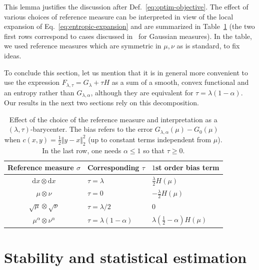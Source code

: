 \documentclass[11pt]{article}
\renewcommand{\d}{\mathrm{d}}
\begin{document}
This lemma justifies the discussion after Def.~\ref{eq:optim-objective}. The effect of various choices of reference measure can be interpreted in view of the local expansion of Eq.~\eqref{eq:entropic-expansion} and are summarized in Table~\ref{table:reference-measures} (the two first rows correspond to cases discussed in~\cite{janati2020debiased} for Gaussian measures). In the table, we used reference measures which are symmetric in $\mu,\nu$ as is standard, to fix ideas.

To conclude this section, let us mention that it is in general more convenient to use the expression $F_{\lambda,\tau}=G_\lambda +\tau H$ as a sum of a smooth, convex functional and an entropy rather than $G_{\lambda,\alpha}$, although they are equivalent for $\tau=\lambda(1-\alpha)$. Our results in the next two sections rely on this decomposition.

\begin{table}
\centering
\begin{tabular}{c|l|l}
Reference measure $\sigma$ & Corresponding $\tau$ & $1$st order bias term \\
\hline
$\d x \otimes \d x$ &$ \tau=\lambda$ & $\frac{\lambda}{2}H(\mu)$ \\
$ \mu \otimes \nu$ & $\tau=0 $ & $- \frac{\lambda}{2} H(\mu) $  \\
$ \sqrt{\mu} \otimes \sqrt{\nu}$ &$\tau=\lambda/2$& $0$  \\
$\mu^\alpha\otimes \nu^\alpha$  &$ \tau=\lambda(1-\alpha)$& $\lambda(\frac12-\alpha)H(\mu)$  \\
\hline
\end{tabular}
\caption{Effect of the choice of the reference measure and interpretation as a $(\lambda,\tau)$-barycenter. The bias refers to the error $G_{\lambda,\alpha}(\mu)-G_0(\mu)$ when $c(x,y)=\frac12\Vert y-x\Vert^2_2$ (up to constant terms independent from $\mu$). In the last row, one needs $\alpha\leq 1$ so that $\tau\geq 0$.}\label{table:reference-measures}
\end{table}



\section{Stability and statistical estimation}\label{sec:statistics}
\end{document}

